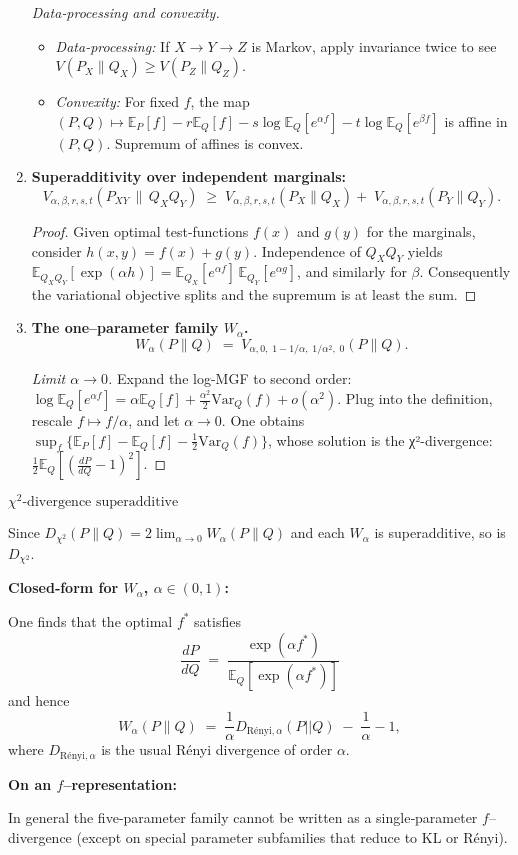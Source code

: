 \documentclass[12pt]{article}
\theoremstyle{definition}
\theoremstyle{remark}
\begin{document}
\begin{enumerate}[label=\arabic*.]
\smallskip
\noindent\emph{Data‐processing and convexity.}
\begin{itemize}
  \item \emph{Data‐processing:} If \(X\to Y\to Z\) is Markov, apply invariance twice to see \(V(P_X\|Q_X)\ge V(P_Z\|Q_Z)\).
  \item \emph{Convexity:} For fixed \(f\), the map \((P,Q)\mapsto\mathbb E_P[f]-r\mathbb E_Q[f]-s\log\mathbb E_Q[e^{\alpha f}]-t\log\mathbb E_Q[e^{\beta f}]\) is affine in \((P,Q)\).  Supremum of affines is convex.
\end{itemize}

\medskip
\item \textbf{Superadditivity over independent marginals:}
\[
V_{\alpha,\beta,r,s,t}(P_{XY}\,\|\,Q_XQ_Y)
\;\ge\;
V_{\alpha,\beta,r,s,t}(P_X\|Q_X)
+\;V_{\alpha,\beta,r,s,t}(P_Y\|Q_Y).
\]
\begin{proof}
Given optimal test‐functions \(f(x)\) and \(g(y)\) for the marginals, consider \(h(x,y)=f(x)+g(y)\).  Independence of \(Q_XQ_Y\) yields 
\(\mathbb E_{Q_XQ_Y}[\exp(\alpha h)]=\mathbb E_{Q_X}[e^{\alpha f}]\,
\mathbb E_{Q_Y}[e^{\alpha g}]\), and similarly for \(\beta\).  Consequently the variational objective splits and the supremum is at least the sum.
\end{proof}

\medskip
\item \textbf{The one–parameter family \(W_\alpha\).}
\[
W_\alpha(P\|Q)
\;=\;
V_{\alpha,0,\;1-1/\alpha,\;1/\alpha^2,\;0}(P\|Q).
\]
\begin{proof}[Limit \(\alpha\to0\)]
Expand the log-MGF to second order:
\(\log\mathbb E_Q[e^{\alpha f}]
=\alpha\mathbb E_Q[f]+\tfrac{\alpha^2}{2}\mathrm{Var}_Q(f)+o(\alpha^2).\)
Plug into the definition, rescale \(f\mapsto f/\alpha\), and let \(\alpha\to0\).  One obtains
\(\sup_f\{\mathbb E_P[f]-\mathbb E_Q[f]-\tfrac12\mathrm{Var}_Q(f)\}\),
whose solution is the χ²-divergence:
\(\frac12\mathbb E_Q[(\tfrac{dP}{dQ}-1)^2]\).
\end{proof}
\end{enumerate}

\medskip
\noindent\(\boxed{\chi^2\text{-divergence superadditive}}\)

Since \(D_{\chi^2}(P\|Q)=2\lim_{\alpha\to0}W_\alpha(P\|Q)\) and each \(W_\alpha\) is superadditive, so is \(D_{\chi^2}\).  

\bigskip
\noindent\textbf{Closed‐form for \(W_\alpha\), \(\alpha\in(0,1)\):}

One finds that the optimal \(f^*\) satisfies
\[
\frac{dP}{dQ}
\;=\;
\frac{\exp(\alpha f^*)}{\mathbb E_Q[\exp(\alpha f^*)]}
\]
and hence
\[
W_\alpha(P\|Q)
\;=\;
\frac1\alpha D_{\mathrm{Rényi},\alpha}(P||Q)
\;-\;
\frac1\alpha-1,
\]
where \(D_{\mathrm{Rényi},\alpha}\) is the usual Rényi divergence of order \(\alpha\).

\bigskip
\noindent\textbf{On an \(f\)–representation:}

In general the five‐parameter family cannot be written as a single‐parameter \(f\)–divergence (except on special parameter subfamilies that reduce to KL or Rényi).
\end{document}
